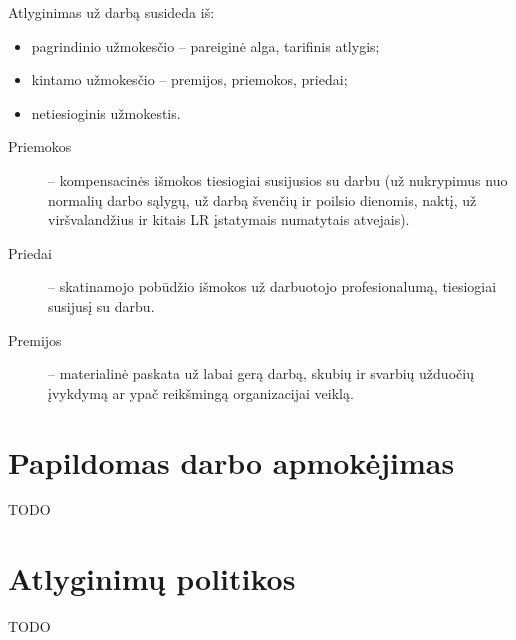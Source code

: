 Atlyginimas už darbą susideda iš:
\begin{itemize}
  \item pagrindinio užmokesčio – pareiginė alga, tarifinis atlygis;
  \item kintamo užmokesčio – premijos, priemokos, priedai;
  \item netiesioginis užmokestis.
\end{itemize}

\begin{description}
  \item[Priemokos] – kompensacinės išmokos tiesiogiai susijusios su darbu
    (už nukrypimus nuo normalių darbo sąlygų, už darbą švenčių ir
    poilsio dienomis, naktį, už viršvalandžius ir kitais LR įstatymais
    numatytais atvejais).
  \item[Priedai] – skatinamojo pobūdžio išmokos už darbuotojo
    profesionalumą, tiesiogiai susijusį su darbu.
  \item[Premijos] – materialinė paskata už labai gerą darbą, skubių ir
    svarbių užduočių įvykdymą ar ypač reikšmingą organizacijai veiklą.
\end{description}

\section{Papildomas darbo apmokėjimas}

TODO

\section{Atlyginimų politikos}

TODO
